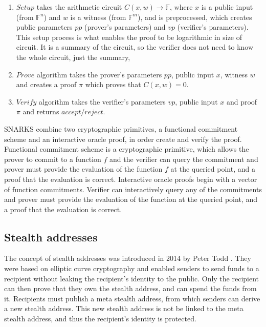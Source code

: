 \documentclass[conference,comsoc,10pt]{IEEEtran}
\begin{document}
        \begin{enumerate}
            \item $Setup$ takes
                the arithmetic circuit $C(x, w) \rightarrow \mathbb{F}$, where $x$ is a public
                input (from $\mathbb{F}^n$) and $w$ is a witness (from $\mathbb{F}^m$), and
                is preprocessed, which creates public parameters $pp$ (prover's parameters)
                and $vp$ (verifier's parameters). This setup process is what enables the
                proof to be logarithmic in size of circuit. It is a summary of the circuit,
                so the verifier does not need to know the whole circuit, just the summary,
            \item $Prove$ algorithm takes the prover's parameters $pp$, public input $x$,
                witness $w$ and creates a proof $\pi$ which proves that $C(x, w) = 0$.
            \item $Verify$ algorithm takes the verifier's parameters $vp$, public input $x$ and
                proof $\pi$ and returns $accept/reject$.
        \end{enumerate}

        SNARKS combine two cryptographic primitives, a functional commitment scheme
        and an interactive oracle proof, in order create and verify the proof.
        Functional commitment scheme is a cryptographic primitive, which allows the
        prover to commit to a function $f$ and the verifier can query the commitment and
        prover must provide the evaluation of the function $f$ at the queried point,
        and a proof that the evaluation is correct.
        Interactive oracle proofs begin with a vector of function commitments.
        Verifier can interactively query any of the commitments and prover must
        provide the evaluation of the function at the queried point, and a proof
        that the evaluation is correct\cite{SassonIOPs}.


    \subsection{Stealth addresses}

        The concept of stealth addresses was introduced in 2014 by Peter Todd \cite{ToddStealthAddresses}.
        They were based on elliptic curve cryptography and enabled senders to
        send funds to a recipient without leaking the recipient's identity to
        the public. Only the recipient can then prove that they own the stealth
        address, and can spend the funds from it. Recipients must publish a meta
        stealth address, from which senders can derive a new stealth address.
        This new stealth address is not be linked to the meta stealth address,
        and thus the recipient's identity is protected.
\end{document}
